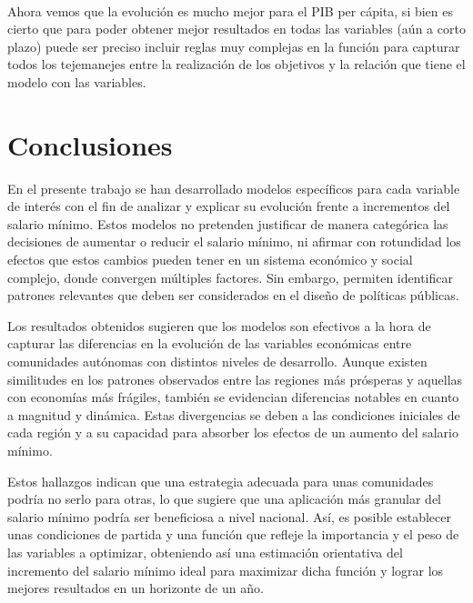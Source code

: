 \documentclass[11pt]{article}
\begin{document}
    \begin{center}
    \end{center}
    { \hspace*{\fill} \\}
    
    Ahora vemos que la evolución es mucho mejor para el PIB per cápita, si
bien es cierto que para poder obtener mejor resultados en todas las
variables (aún a corto plazo) puede ser preciso incluir reglas muy
complejas en la función para capturar todos los tejemanejes entre la
realización de los objetivos y la relación que tiene el modelo con las
variables.

    \section{Conclusiones}\label{conclusiones}

    En el presente trabajo se han desarrollado modelos específicos para cada
variable de interés con el fin de analizar y explicar su evolución
frente a incrementos del salario mínimo. Estos modelos no pretenden
justificar de manera categórica las decisiones de aumentar o reducir el
salario mínimo, ni afirmar con rotundidad los efectos que estos cambios
pueden tener en un sistema económico y social complejo, donde convergen
múltiples factores. Sin embargo, permiten identificar patrones
relevantes que deben ser considerados en el diseño de políticas
públicas.

Los resultados obtenidos sugieren que los modelos son efectivos a la
hora de capturar las diferencias en la evolución de las variables
económicas entre comunidades autónomas con distintos niveles de
desarrollo. Aunque existen similitudes en los patrones observados entre
las regiones más prósperas y aquellas con economías más frágiles,
también se evidencian diferencias notables en cuanto a magnitud y
dinámica. Estas divergencias se deben a las condiciones iniciales de
cada región y a su capacidad para absorber los efectos de un aumento del
salario mínimo.

Estos hallazgos indican que una estrategia adecuada para unas
comunidades podría no serlo para otras, lo que sugiere que una
aplicación más granular del salario mínimo podría ser beneficiosa a
nivel nacional. Así, es posible establecer unas condiciones de partida y
una función que refleje la importancia y el peso de las variables a
optimizar, obteniendo así una estimación orientativa del incremento del
salario mínimo ideal para maximizar dicha función y lograr los mejores
resultados en un horizonte de un año.
\end{document}
